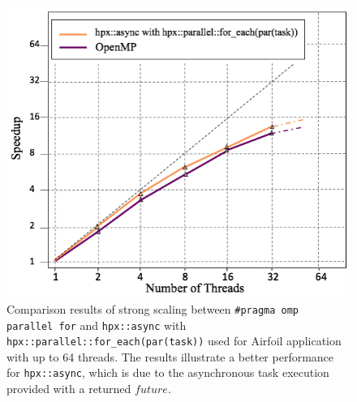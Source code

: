 \documentclass[conference]{IEEEtran}
\begin{document}
\begin{figure} 
\begin{center}
\centering
\includegraphics[width=1\columnwidth]{Pictures/async.jpg}
\caption {\small{Comparison results of strong scaling between \texttt{\#pragma omp parallel for} and \texttt{hpx::async} with \texttt{hpx::parallel::for\_each(par(task))} used for Airfoil application
with up to 64 threads. The results illustrate a better performance for \texttt{hpx::async}, which is due to the asynchronous task execution provided with a returned $future$. }}
\label{f3}
\end{center}
\end{figure}
\end{document}
